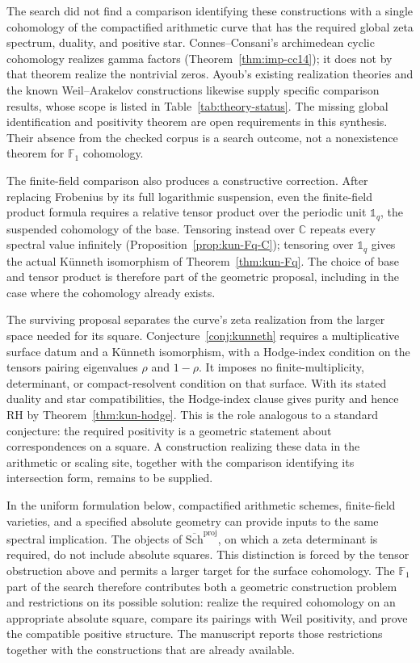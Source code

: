 \documentclass[11pt]{amsart}
\theoremstyle{plain}
\theoremstyle{definition}
\theoremstyle{remark}
\numberwithin{equation}{section}
\newcommand{\C}{\mathbb{C}}
\newcommand{\F}{\mathbb{F}}
\newcommand{\Schbar}{\overline{\mathrm{Sch}}}
\begin{document}
The search did not find a comparison identifying these constructions
with a single cohomology of the compactified arithmetic curve that
has the required global zeta spectrum, duality, and positive star.
Connes--Consani's archimedean cyclic cohomology realizes gamma factors
(Theorem~\ref{thm:imp-cc14}); it does not by that theorem realize the
nontrivial zeros. Ayoub's existing realization theories and the known
Weil--Arakelov constructions likewise supply specific comparison
results, whose scope is listed in Table~\ref{tab:theory-status}.
The missing global identification and positivity theorem are open
requirements in this synthesis. Their absence from the checked corpus
is a search outcome, not a nonexistence theorem for $\F_1$ cohomology.

The finite-field comparison also produces a constructive correction.
After replacing Frobenius by its full logarithmic suspension, even the
finite-field product formula requires a relative tensor product over
the periodic unit $\mathbb 1_q$, the suspended cohomology of the base.
Tensoring instead over $\C$ repeats every spectral value infinitely
(Proposition~\ref{prop:kun-Fq-C}); tensoring over $\mathbb 1_q$ gives
the actual K\"unneth isomorphism of Theorem~\ref{thm:kun-Fq}.
The choice of base and tensor product is therefore part of the
geometric proposal, including in the case where the cohomology already
exists.

The surviving proposal separates the curve's zeta realization from the
larger space needed for its square. Conjecture~\ref{conj:kunneth}
requires a multiplicative surface datum and a K\"unneth isomorphism,
with a Hodge-index condition on the tensors pairing eigenvalues
$\rho$ and $1-\rho$. It imposes no finite-multiplicity, determinant, or
compact-resolvent condition on that surface. With its stated duality
and star compatibilities, the Hodge-index clause gives purity and
hence RH by Theorem~\ref{thm:kun-hodge}. This is the role analogous to
a standard conjecture: the required positivity is a geometric
statement about correspondences on a square. A construction realizing
these data in the arithmetic or scaling site, together with the
comparison identifying its intersection form, remains to be supplied.

In the uniform formulation below, compactified arithmetic schemes,
finite-field varieties, and a specified absolute geometry can provide
inputs to the same spectral implication. The objects of
$\Schbar^{\mathrm{proj}}$, on which a zeta determinant is required, do
not include absolute squares. This distinction
is forced by the tensor obstruction above
and permits a larger target for the surface cohomology. The
$\F_1$ part of the search therefore contributes both a geometric
construction problem and restrictions on its possible solution:
realize the required cohomology on an appropriate absolute square,
compare its pairings with Weil positivity, and prove the compatible
positive structure. The manuscript reports those restrictions together with
the constructions that are already available.
\end{document}
